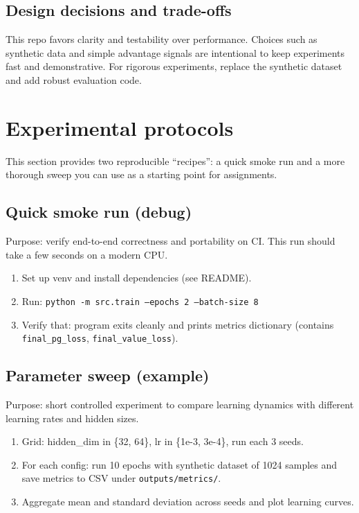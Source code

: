 \documentclass[11pt,a4paper]{article}
\newcommand{\code}[1]{\texttt{#1}}
\begin{document}
\subsection{Design decisions and trade-offs}
This repo favors clarity and testability over performance. Choices such as synthetic data and simple advantage signals are intentional to keep experiments fast and demonstrative. For rigorous experiments, replace the synthetic dataset and add robust evaluation code.

\section{Experimental protocols}
This section provides two reproducible ``recipes'': a quick smoke run and a more thorough sweep you can use as a starting point for assignments.

\subsection{Quick smoke run (debug)}
Purpose: verify end-to-end correctness and portability on CI. This run should take a few seconds on a modern CPU.
\begin{enumerate}
  \item Set up venv and install dependencies (see README).
  \item Run: \code{python -m src.train --epochs 2 --batch-size 8}
  \item Verify that: program exits cleanly and prints metrics dictionary (contains \code{final\_pg\_loss}, \code{final\_value\_loss}).
\end{enumerate}

\subsection{Parameter sweep (example)}
Purpose: short controlled experiment to compare learning dynamics with different learning rates and hidden sizes.
\begin{enumerate}
  \item Grid: hidden_dim in \{32, 64\}, lr in \{1e-3, 3e-4\}, run each 3 seeds.
  \item For each config: run 10 epochs with synthetic dataset of 1024 samples and save metrics to CSV under \code{outputs/metrics/}.
  \item Aggregate mean and standard deviation across seeds and plot learning curves.
\end{enumerate}
\end{document}
